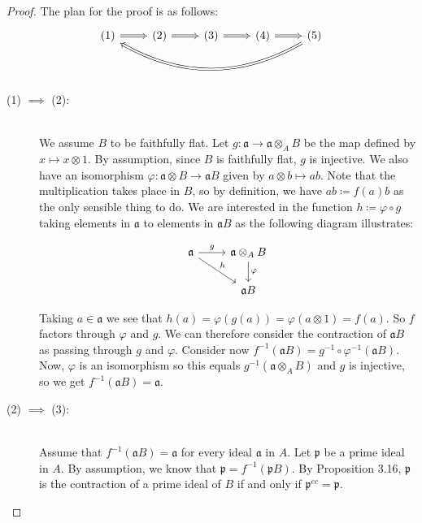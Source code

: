 \documentclass{article}
\newcommand{\p}{\mathfrak{p}}
\newcommand{\tensor}{\otimes}
\renewcommand{\a}{\mathfrak{a}}
\begin{document}
    \begin{proof} The plan for the proof is as follows:
        \begin{equation}
            \notag
            \begin{tikzcd}
                (1) \ar[r, Rightarrow] & (2) \ar[r, Rightarrow] & (3) \ar[r, Rightarrow] & (4) \ar[r, Rightarrow] & (5) \ar[llll, bend left, Rightarrow]\\
            \end{tikzcd}
        \end{equation}

        \begin{description}
            \item[(1) $\implies$ (2):]\hfill \\ We assume $B$ to be
                faithfully flat. Let $g\colon \a \to \a \tensor_A B$ be
                the map defined by $x \mapsto x \tensor 1$.  By
                assumption, since $B$ is faithfully flat, $g$ is
                injective. We also have an isomorphism $\varphi \colon \a
                \tensor B \to \a B$ given by $a\tensor b \mapsto ab$. Note
                that the multiplication takes place in $B$, so by
                definition, we have $ab \coloneqq f(a)b$ as the only
                sensible thing to do. We are interested in the function $h
                \coloneqq \varphi \circ g$ taking elements in $\a$ to
                elements in $\a B$ as the following diagram illustrates:

            \begin{equation}
                \notag
                \begin{tikzcd}
                    \a \ar[r, "g"] \ar[dr, "h"] & \a \tensor_A B \ar[d, "\varphi"]\\
                    & \a B
                \end{tikzcd}
            \end{equation}

            Taking $a \in \a$ we see that $h(a) = \varphi(g(a)) = \varphi(a
            \tensor 1) = f(a)$. So $f$ factors through $\varphi$ and $g$. We
            can therefore consider the contraction of $\a B$ as passing through
            $g$ and $\varphi$. Consider now $f^{-1}(\a B) = g^{-1}\circ
            \varphi^{-1} (\a B)$. Now, $\varphi$ is an isomorphism so this
            equals $g^{-1}(\a \tensor_A B)$ and $g$ is injective, so we get
            $f^{-1}(\a B) = \a$.
    
            \item[(2) $\implies$ (3):]\hfill \\
                Assume that $f^{-1}(\a B) = \a$ for every ideal $\a$ in $A$.
                Let $\p$ be a prime ideal in $A$. By assumption, we know that
                $\p = f^{-1}(\p B)$. By Proposition 3.16, $\p$ is the
                contraction of a prime ideal of $B$ if and only if $\p^{ec} =
                \p$.


\end{description}
\end{proof}
\end{document}
